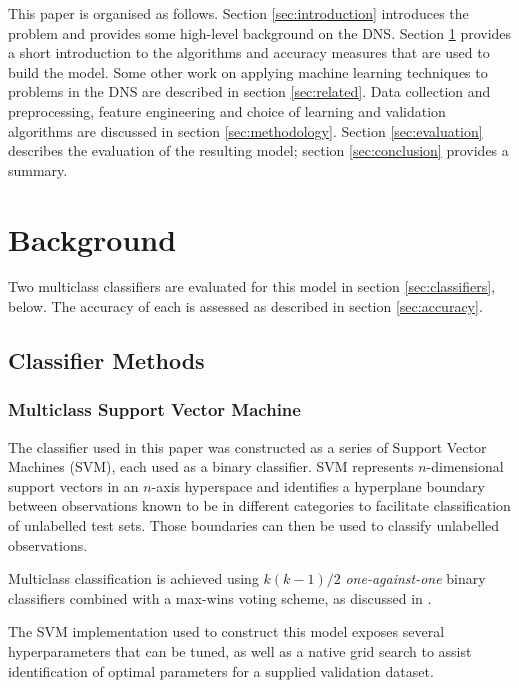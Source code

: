 \documentclass[conference]{IEEEtran}
\let\citep\cite
\begin{document}
This paper is organised as follows. Section \ref{sec:introduction}
introduces the problem and provides some high-level background on the
DNS. Section \ref{sec:background} provides a short introduction to the
algorithms and accuracy measures that are used to build the model. Some
other work on applying machine learning techniques to problems in the
DNS are described in section \ref{sec:related}. Data collection and
preprocessing, feature engineering and choice of learning and validation
algorithms are discussed in section \ref{sec:methodology}. Section
\ref{sec:evaluation} describes the evaluation of the resulting model;
section \ref{sec:conclusion} provides a summary.

\section{Background}\label{sec:background}

\label{sec:background}

Two multiclass classifiers are evaluated for this model in section
\ref{sec:classifiers}, below. The accuracy of each is assessed as
described in section \ref{sec:accuracy}.

\subsection{Classifier Methods}\label{sec:classifier-methods}

\label{sec:classifiers}

\subsubsection{Multiclass Support Vector
Machine}\label{sec:multiclass-support-vector-machine}

The classifier used in this paper was constructed as a series of Support
Vector Machines (SVM), each used as a binary classifier. SVM represents
\(n\)-dimensional support vectors in an \(n\)-axis hyperspace and
identifies a hyperplane boundary between observations known to be in
different categories to facilitate classification of unlabelled test
sets. Those boundaries can then be used to classify unlabelled
observations.

Multiclass classification is achieved using \(k(k-1)/2\)
\emph{one-against-one} binary classifiers combined with a max-wins
voting scheme, as discussed in \citep{10.1007/11494683_28}.

The SVM implementation used to construct this model exposes several
hyperparameters that can be tuned, as well as a native grid search to
assist identification of optimal parameters for a supplied validation
dataset.
\end{document}
